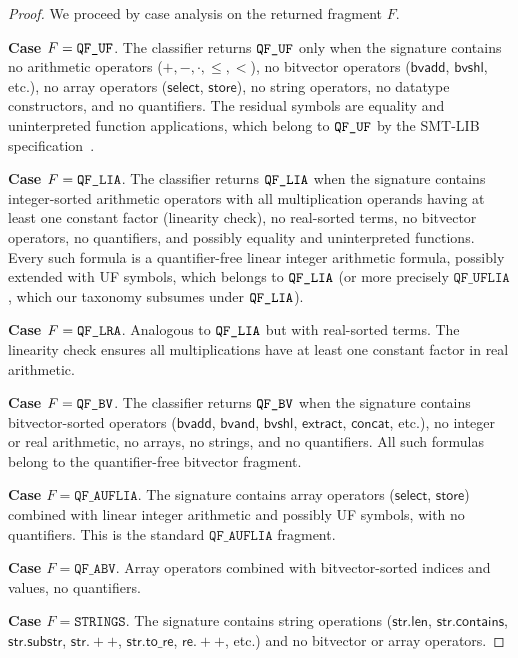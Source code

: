 \documentclass[11pt]{article}
\begin{document}
\begin{proof}
We proceed by case analysis on the returned fragment $F$.

\medskip\noindent\textbf{Case $F = \texttt{QF\_UF}$}.\quad
The classifier returns $\texttt{QF\_UF}$ only when the signature
contains no arithmetic operators ($+, -, \cdot, \leq, <$),
no bitvector operators ($\mathsf{bvadd}$, $\mathsf{bvshl}$, etc.),
no array operators ($\mathsf{select}$, $\mathsf{store}$),
no string operators, no datatype constructors, and no
quantifiers.  The residual symbols are equality and
uninterpreted function applications, which belong to
$\texttt{QF\_UF}$ by the SMT-LIB specification~\cite{smtlib}.

\medskip\noindent\textbf{Case $F = \texttt{QF\_LIA}$}.\quad
The classifier returns $\texttt{QF\_LIA}$ when the signature
contains integer-sorted arithmetic operators with all
multiplication operands having at least one constant factor
(linearity check), no real-sorted terms, no bitvector
operators, no quantifiers, and possibly equality and
uninterpreted functions.  Every such formula is a
quantifier-free linear integer arithmetic formula,
possibly extended with UF symbols, which belongs to
$\texttt{QF\_LIA}$ (or more precisely $\texttt{QF\_UFLIA}$,
which our taxonomy subsumes under $\texttt{QF\_LIA}$).

\medskip\noindent\textbf{Case $F = \texttt{QF\_LRA}$}.\quad
Analogous to $\texttt{QF\_LIA}$ but with real-sorted terms.
The linearity check ensures all multiplications have
at least one constant factor in real arithmetic.

\medskip\noindent\textbf{Case $F = \texttt{QF\_BV}$}.\quad
The classifier returns $\texttt{QF\_BV}$ when the signature
contains bitvector-sorted operators ($\mathsf{bvadd}$,
$\mathsf{bvand}$, $\mathsf{bvshl}$, $\mathsf{extract}$,
$\mathsf{concat}$, etc.), no integer or real arithmetic,
no arrays, no strings, and no quantifiers.  All such
formulas belong to the quantifier-free bitvector
fragment.

\medskip\noindent\textbf{Case $F = \texttt{QF\_AUFLIA}$}.\quad
The signature contains array operators ($\mathsf{select}$,
$\mathsf{store}$) combined with linear integer arithmetic
and possibly UF symbols, with no quantifiers.  This is
the standard $\texttt{QF\_AUFLIA}$ fragment.

\medskip\noindent\textbf{Case $F = \texttt{QF\_ABV}$}.\quad
Array operators combined with bitvector-sorted indices
and values, no quantifiers.

\medskip\noindent\textbf{Case $F = \texttt{STRINGS}$}.\quad
The signature contains string operations
($\mathsf{str.len}$, $\mathsf{str.contains}$,
$\mathsf{str.substr}$, $\mathsf{str.++}$,
$\mathsf{str.to\_re}$, $\mathsf{re.++}$, etc.)
and no bitvector or array operators.


\end{proof}
\end{document}
